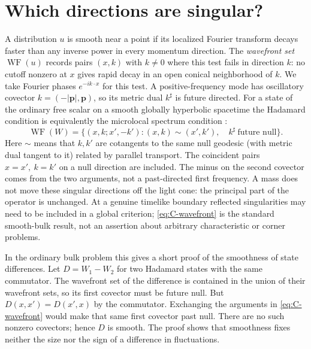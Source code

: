 \section{Which directions are singular?}
A distribution $u$ is smooth near a point if its localized Fourier
transform decays faster than any inverse power in every momentum
direction. The \emph{wavefront set} $\operatorname{WF}(u)$ records pairs
$(x,k)$ with $k\ne0$ where this test fails in direction $k$: no cutoff
nonzero at $x$ gives rapid decay in an open conical neighborhood of $k$.
We take Fourier phases $e^{-ik\cdot x}$ for this test. A positive-frequency
mode has oscillatory covector $k=(-|\mathbf p|,\mathbf p)$, so its
metric dual $k^\sharp$ is future directed. For a state of the ordinary
free scalar on a smooth globally hyperbolic spacetime the Hadamard
condition is equivalently the microlocal spectrum condition \cite{Rad}:
\begin{equation}
 \operatorname{WF}(W)=\{(x,k;x',-k'):(x,k)\sim(x',k'),\quad
                              k^\sharp\ \text{future null}\} .
 \label{eq:C-wavefront}
\end{equation}
Here $\sim$ means that $k,k'$ are cotangents to the same null geodesic
(with metric dual tangent to it) related by parallel transport. The
coincident pairs $x=x',\ k=k'$ on a null direction are included. The minus
on the second covector comes from the two arguments, not a past-directed
first frequency. A mass does not move these singular directions off the
light cone: the principal part of the operator is unchanged. At a genuine
timelike boundary reflected singularities may need to be included in a
global criterion; \eqref{eq:C-wavefront} is the standard smooth-bulk
result, not an assertion about arbitrary characteristic or corner problems.

In the ordinary bulk problem this gives a short proof of the smoothness of
state differences. Let $D=W_1-W_2$ for two Hadamard states with the same
commutator. The wavefront set of the difference is contained in the union
of their wavefront sets, so its first covector must be future null. But
$D(x,x')=D(x',x)$ by the commutator. Exchanging the arguments in
\eqref{eq:C-wavefront} would make that same first covector past null.
There are no such nonzero covectors; hence $D$ is smooth. The proof shows
that smoothness fixes neither the size nor the sign of a difference in
fluctuations.

